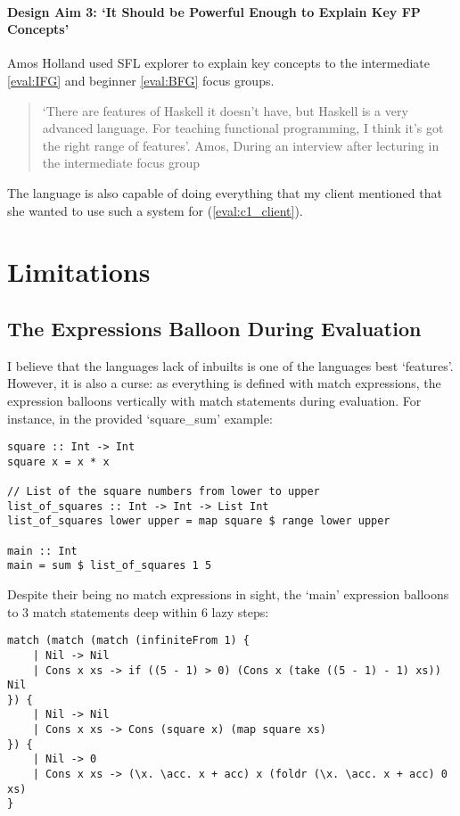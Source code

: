 \paragraph{Design Aim 3: `It Should be Powerful Enough to Explain Key \ac{FP} Concepts'}
Amos Holland used SFL explorer to explain key concepts to the intermediate \ref{eval:IFG} and beginner \ref{eval:BFG} focus groups. 

\begin{quotation}
\noindent `There are features of Haskell it doesn't have, but Haskell is a very advanced language. For teaching functional programming, I think it's got the right range of features'. Amos, During an interview after lecturing in the intermediate focus group
\end{quotation}

\noindent The language is also capable of doing everything that my client mentioned that she wanted to use such a system for (\ref{eval:c1_client}).


\section{Limitations}
\subsection{The Expressions Balloon During Evaluation}
\label{conc:baboon}
I believe that the languages lack of inbuilts is one of the languages best `features'. However, it is also a curse: as everything is defined with match expressions, the expression balloons vertically with match statements during evaluation. For instance, in the provided `square\_sum' example:

\begin{lstlisting}[language=SFL]
square :: Int -> Int
square x = x * x

// List of the square numbers from lower to upper
list_of_squares :: Int -> Int -> List Int
list_of_squares lower upper = map square $ range lower upper

main :: Int
main = sum $ list_of_squares 1 5
\end{lstlisting}

Despite their being no match expressions in sight, the `main' expression balloons to 3 match statements deep within 6 lazy steps:

\begin{lstlisting}[language=SFL]
match (match (match (infiniteFrom 1) {
    | Nil -> Nil
    | Cons x xs -> if ((5 - 1) > 0) (Cons x (take ((5 - 1) - 1) xs)) Nil
}) {
    | Nil -> Nil
    | Cons x xs -> Cons (square x) (map square xs)
}) {
    | Nil -> 0
    | Cons x xs -> (\x. \acc. x + acc) x (foldr (\x. \acc. x + acc) 0 xs)
}
\end{lstlisting}

